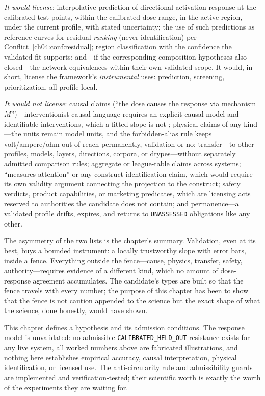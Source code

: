 \emph{It would license}: interpolative prediction of directional activation
response at the calibrated test points, within the calibrated dose range,
in the active region, under the current profile, with stated uncertainty;
the use of such predictions as reference curves for residual
\emph{ranking} (never identification) per
Conflict~\ref{ch04:conf:residual}; region classification with the
confidence the validated fit supports; and---if the corresponding
composition hypotheses also closed---the network equivalences within their
own validated scope. It would, in short, license the framework's
\emph{instrumental} uses: prediction, screening, prioritization, all
profile-local.

\emph{It would not license}: causal claims (``the dose causes the response
via mechanism $M$'')---interventionist causal language requires an explicit
causal model and identifiable interventions, which a fitted slope is not
\cite{pearl}; physical claims of any kind---the units remain model units,
and the forbidden-alias rule keeps volt/ampere/ohm out of reach
permanently, validation or no; transfer---to other profiles, models,
layers, directions, corpora, or dtypes---without separately admitted
comparison rules; aggregate or league-table claims across systems;
``measures attention'' or any construct-identification claim, which would
require its own validity argument connecting the projection to the
construct; safety verdicts, product capabilities, or marketing predicates,
which are licensing acts reserved to authorities the candidate does not
contain; and permanence---a validated profile drifts, expires, and returns
to \texttt{UNASSESSED} obligations like any other.

The asymmetry of the two lists is the chapter's summary. Validation, even
at its best, buys a bounded instrument: a locally trustworthy slope with
error bars, inside a fence. Everything outside the fence---cause, physics,
transfer, safety, authority---requires evidence of a different kind, which
no amount of dose-response agreement accumulates. The candidate's types
are built so that the fence travels with every number; the purpose of this
chapter has been to show that the fence is not caution appended to the
science but the exact shape of what the science, done honestly, would have
shown.

\begin{boundary}\label{ch06:bound}
This chapter defines a hypothesis and its admission conditions. The
response model is unvalidated: no admissible \texttt{CALIBRATED\_HELD\_OUT}
resistance exists for any live system, all worked numbers above are
fabricated illustrations, and nothing here establishes empirical accuracy,
causal interpretation, physical identification, or licensed use. The
anti-circularity rule and admissibility guards are implemented and
verification-tested; their scientific worth is exactly the worth of the
experiments they are waiting for.
\end{boundary}
